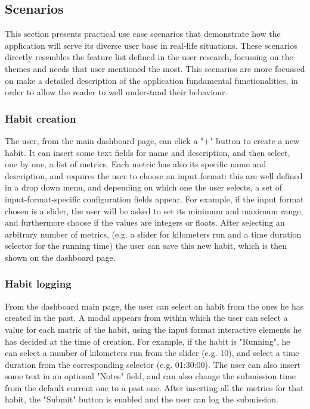 \documentclass{article}
\begin{document}
\subsection{Scenarios}

This section presents practical use case scenarios that demonstrate how the application will serve its diverse user base in real-life situations.
These scenarios directly resembles the feature list defined in the user research, focussing on the themes and needs that user mentioned the most.
This scenarios are more focussed on make a detailed description of the application fundamental functionalities, in order to allow the reader to well understand their behaviour.

\subsubsection{Habit creation}

The user, from the main dashboard page, can click a "+" button to create a new habit.
It can insert some text fields for name and description, and then select, one by one, a list of metrics.
Each metric has also its specific name and description, and requires the user to choose an input format: this are well defined in a drop down menu, and depending on which one the user selects, a set of input-format-specific configuration fields appear.
For example, if the input format chosen is a slider, the user will be asked to set its minimum and maximum range, and furthermore choose if the values are integers or floats.
After selecting an arbitrary number of metrics, (e.g. a slider for kilometers run and a time duration selector for the running time) the user can save this new habit, which is then shown on the dashboard page.

\subsubsection{Habit logging}

From the dashboard main page, the user can select an habit from the ones he has created in the past.
A modal appears from within which the user can select a value for each matric of the habit, using the input format interactive elements he has decided at the time of creation.
For example, if the habit is "Running", he can select a number of kilometers run from the slider (e.g. 10), and select a time duration from the corresponding selector (e.g. 01:30:00).
The user can also insert some text in an optional "Notes" field, and can also change the submission time from the default current one to a past one.
After inserting all the metrics for that habit, the "Submit" button is enabled and the user can log the submission.
\end{document}

